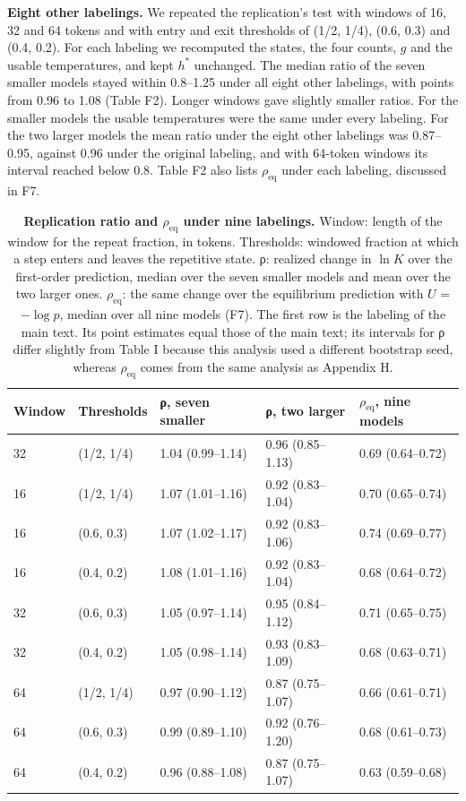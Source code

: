 \documentclass[aps,prx,onecolumn,superscriptaddress,longbibliography]{revtex4-2}
\begin{document}
\textbf{Eight other labelings.} We repeated the replication's test with windows of 16, 32 and 64 tokens and with entry and exit thresholds of (1/2, 1/4), (0.6, 0.3) and (0.4, 0.2). For each labeling we recomputed the states, the four counts, \(g\) and the usable temperatures, and kept \(h^*\) unchanged. The median ratio of the seven smaller models stayed within 0.8--1.25 under all eight other labelings, with points from 0.96 to 1.08 (Table F2). Longer windows gave slightly smaller ratios. For the smaller models the usable temperatures were the same under every labeling. For the two larger models the mean ratio under the eight other labelings was 0.87--0.95, against 0.96 under the original labeling, and with 64-token windows its interval reached below 0.8. Table F2 also lists \(\rho_{\mathrm{eq}}\) under each labeling, discussed in F7.

\begin{table}[htbp]
\centering
\small
\setlength{\tabcolsep}{6pt}
\renewcommand{\thetable}{F2}
\caption{\textbf{Replication ratio and \(\rho_{\mathrm{eq}}\) under nine labelings.} Window: length of the window for the repeat fraction, in tokens. Thresholds: windowed fraction at which a step enters and leaves the repetitive state. ρ: realized change in \(\ln K\) over the first-order prediction, median over the seven smaller models and mean over the two larger ones. \(\rho_{\mathrm{eq}}\): the same change over the equilibrium prediction with \(U\) = \(-\log p\), median over all nine models (F7). The first row is the labeling of the main text. Its point estimates equal those of the main text; its intervals for ρ differ slightly from Table I because this analysis used a different bootstrap seed, whereas \(\rho_{\mathrm{eq}}\) comes from the same analysis as Appendix H.}
\label{tabF2}
\begin{tabular}{@{}lllll@{}}
\toprule
Window & Thresholds & ρ, seven smaller & ρ, two larger & \(\rho_{\mathrm{eq}}\), nine models \\
\midrule
32 & (1/2, 1/4) & 1.04 (0.99--1.14) & 0.96 (0.85--1.13) & 0.69 (0.64--0.72) \\
16 & (1/2, 1/4) & 1.07 (1.01--1.16) & 0.92 (0.83--1.04) & 0.70 (0.65--0.74) \\
16 & (0.6, 0.3) & 1.07 (1.02--1.17) & 0.92 (0.83--1.06) & 0.74 (0.69--0.77) \\
16 & (0.4, 0.2) & 1.08 (1.01--1.16) & 0.92 (0.83--1.04) & 0.68 (0.64--0.72) \\
32 & (0.6, 0.3) & 1.05 (0.97--1.14) & 0.95 (0.84--1.12) & 0.71 (0.65--0.75) \\
32 & (0.4, 0.2) & 1.05 (0.98--1.14) & 0.93 (0.83--1.09) & 0.68 (0.63--0.71) \\
64 & (1/2, 1/4) & 0.97 (0.90--1.12) & 0.87 (0.75--1.07) & 0.66 (0.61--0.71) \\
64 & (0.6, 0.3) & 0.99 (0.89--1.10) & 0.92 (0.76--1.20) & 0.68 (0.61--0.73) \\
64 & (0.4, 0.2) & 0.96 (0.88--1.08) & 0.87 (0.75--1.07) & 0.63 (0.59--0.68) \\
\bottomrule
\end{tabular}
\end{table}
\end{document}
